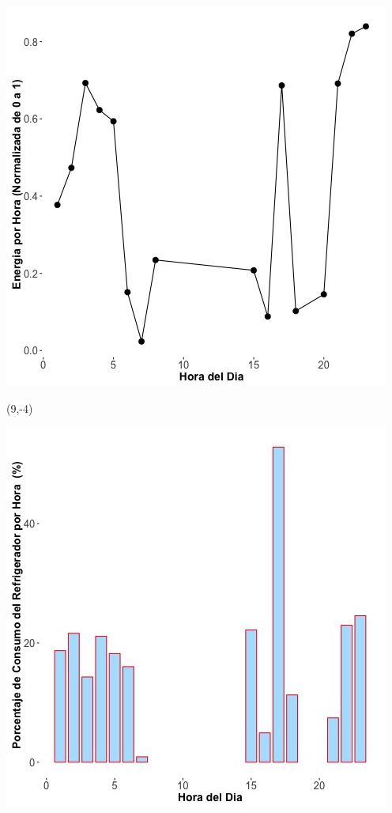 \documentclass{article}\usepackage[]{graphicx}\usepackage[]{color}
\newenvironment{knitrout}{}{} %
\begin{document}
\begin{knitrout}
\color{fgcolor}
\includegraphics[scale=0.75]{figure/A12_fplot_norm_median} 
\end{knitrout}


 \begin{textblock}{1}(9,-4)
\begin{minipage}{20em}
\begingroup

\endgroup
\end{minipage}
\end{textblock}

 \vspace{2cm}

\begin{knitrout}
\color{fgcolor}
\includegraphics[scale=0.65]{figure/A12_fridge_energy_pct.jpg} 
\end{knitrout}
\end{document}
